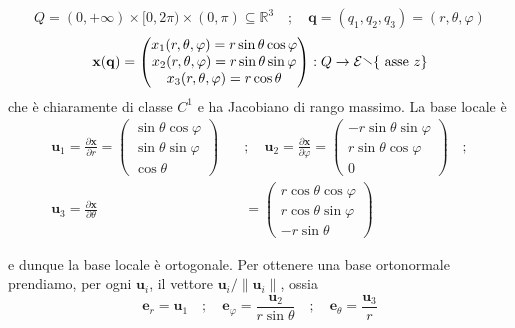 \begin{example}
    \[
        Q = {(0, +\infty)} \times [0, 2\pi) \times (0, \pi) \subseteq
        \mathbb{R}^3 \quad ; \quad \mathbf{q} = {(q_1, q_2, q_3)} = {(r, \theta,
        \varphi)}
    \]
    \[
      \mathbf{x} {(\mathbf{q} )} = \begin{pmatrix}
          x_{1}{(r, \theta, \varphi)} = r \sin \theta \cos \varphi  \\
          x_{2}{(r, \theta, \varphi)} = r \sin \theta \sin \varphi  \\
          x_{3}{(r, \theta, \varphi)} = r \cos \theta
      \end{pmatrix} : Q \to \mathcal{E} \sminus \{\text{ asse \(z\)}\} 
    \]
    che è chiaramente di classe \(C^{1}\) e ha Jacobiano di rango massimo. La
    base locale è
    \begin{align*}
      \mathbf{u}_1 = \frac{\partial \mathbf{x} }{\partial r} = \begin{pmatrix}
          \sin \theta \cos \varphi \\
          \sin \theta \sin \varphi \\
          \cos \theta
          \end{pmatrix} \quad &; \quad \mathbf{u}_2 = \frac{\partial \mathbf{x}
          }{\partial \varphi } = \begin{pmatrix}
          - r \sin \theta \sin \varphi \\
          r \sin \theta \cos \varphi \\
          0
      \end{pmatrix} \quad ; \\ \mathbf{u}_3 = \frac{\partial \mathbf{x}
      }{\partial \theta} &= \begin{pmatrix}
          r \cos \theta \cos \varphi \\
          r \cos \theta \sin \varphi \\
          -r\sin \theta
      \end{pmatrix}
    \end{align*}

    e dunque la base locale è ortogonale. Per ottenere una base ortonormale
    prendiamo, per ogni \(\mathbf{u} _{i}\), il vettore \(\mathbf{u}_i /
    \|\mathbf{u} _i\|\), ossia
    \[
      \mathbf{e}_r = \mathbf{u}_1 \quad ; \quad \mathbf{e}_\varphi =
      \frac{\mathbf{u}_2}{r \sin\theta} \quad ;  \quad \mathbf{e}_\theta =
      \frac{\mathbf{u}_3}{r}
    \]
\end{example}


